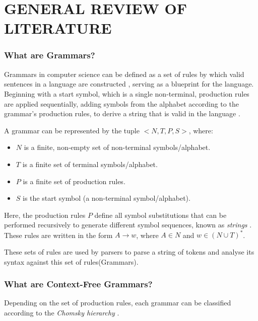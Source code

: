 \chapter{GENERAL REVIEW OF LITERATURE}

\subsection{What are Grammars?}

Grammars in computer science can be defined as a set of rules by which valid sentences in a language are constructed \cite{jiangFormalGrammarsLanguages}, serving as a blueprint for the language. Beginning with a start symbol, which is a single non-terminal, production rules are applied sequentially, adding symbols from the alphabet according to the grammar’s production rules, to derive a string that is valid in the language \cite{GrammarTheoryComputation2025}.

\vspace{\baselineskip}

A grammar can be represented by the tuple $<N, T, P, S>$, where:
\begin{itemize}
\item $N$ is a finite, non-empty set of non-terminal symbols/alphabet.
\item $T$ is a finite set of terminal symbols/alphabet.
\item $P$ is a finite set of production rules.
\item $S$ is the start symbol (a non-terminal symbol/alphabet).
\end{itemize}

Here, the production rules $P$ define all symbol substitutions that can be performed recursively to generate different symbol sequences, known as \emph{strings} \cite{GrammarTheoryComputation2025}. These rules are written in the form $A \rightarrow w$, where $A \in N$ and $w \in (N \cup T)^*$.

\vspace{\baselineskip}
These sets of rules are used by parsers to parse a string of tokens and analyse its syntax against this set of rules(Grammars)\cite{mulikComparisonParsingTechniques,hendriksConsiderItParsed}.

\subsection{What are Context-Free Grammars?}

Depending on the set of production rules, each grammar can be classified according to the \emph{Chomsky hierarchy} \cite{chomskyTHREEMODELSTIE1956}.

